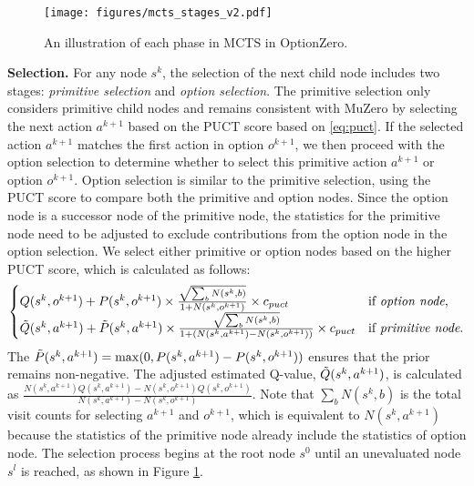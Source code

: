 \begin{figure}
    \centering
    \texttt{[image: figures/mcts\_stages\_v2.pdf]}
    \caption{An illustration of each phase in MCTS in OptionZero.}
    \label{fig:mcts_stages}
\end{figure}

\textbf{Selection.} For any node $s^k$, the selection of the next child node includes two stages: \textit{primitive selection} and \textit{option selection}.
The primitive selection only considers primitive child nodes and remains consistent with MuZero by selecting the next action $a^{k+1}$ based on the PUCT score based on \eqref{eq:puct}.
If the selected action $a^{k+1}$ matches the first action in option $o^{k+1}$, we then proceed with the option selection to determine whether to select this primitive action $a^{k+1}$ or option $o^{k+1}$.
Option selection is similar to the primitive selection, using the PUCT score to compare both the primitive and option nodes.
Since the option node is a successor node of the primitive node, the statistics for the primitive node need to be adjusted to exclude contributions from the option node in the option selection.
We select either primitive or option nodes based on the higher PUCT score, which is calculated as follows:
\begin{equation}\label{eq:option_mcts_puct}
\begin{cases}
    Q(s^k,o^{k+1})+P(s^k,o^{k+1}) \times \frac{\sqrt{\sum_b N(s^k, b)}}{1+N(s^k, o^{k+1})} \times c_{puct} & \text{if }\textit{option node}\text{,}\\
    \Tilde{Q}(s^k,a^{k+1})+\Tilde{P}(s^k, a^{k+1}) \times \frac{\sqrt{\sum_b N(s^k, b)}}{1+(N(s^k, a^{k+1})-N(s^k, o^{k+1}))} \times c_{puct} & \text{if }\textit{primitive node}\text{.}
\end{cases}
\end{equation}
The $\Tilde{P}(s^k, a^{k+1})=\max(0, P(s^k, a^{k+1})-P(s^k, o^{k+1}))$ ensures that the prior remains non-negative.
The adjusted estimated Q-value, $\Tilde{Q}(s^k,a^{k+1})$, is calculated as $\frac{N(s^k, a^{k+1})Q(s^k,a^{k+1}) - N(s^k, o^{k+1})Q(s^k,o^{k+1})}{N(s^k, a^{k+1})-N(s^k, o^{k+1})}$.
Note that $\sum_b N(s^k, b)$ is the total visit counts for selecting $a^{k+1}$ and $o^{k+1}$, which is equivalent to $N(s^k, a^{k+1})$ because the statistics of the primitive node already include the statistics of option node.
The selection process begins at the root node $s^0$ until an unevaluated node $s^l$ is reached, as shown in Figure \ref{fig:mcts_stages}.

